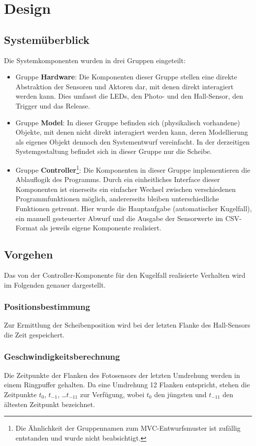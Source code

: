 \chapter{Design}\label{k_design}
\section{Systemüberblick}\label{design_systemueberlick}
Die Systemkomponenten wurden in drei Gruppen eingeteilt:
\begin{itemize}
	\item Gruppe \textbf{Hardware}: Die Komponenten dieser Gruppe stellen eine direkte Abstraktion der Sensoren und Aktoren dar, mit denen direkt interagiert werden kann.
	Dies umfasst die LEDs, den Photo- und den Hall-Sensor, den Trigger und das Release.
	\item Gruppe \textbf{Model}: In dieser Gruppe befinden sich (physikalisch vorhandene) Objekte, mit denen nicht direkt interagiert werden kann, deren Modellierung als eigenes Objekt dennoch den Systementwurf vereinfacht.
	In der derzeitigen Systemgestaltung befindet sich in dieser Gruppe nur die Scheibe.
	\item Gruppe \textbf{Controller}\footnote{Die Ähnlichkeit der Gruppennamen zum MVC-Entwurfsmuster ist zufällig entstanden und wurde nicht beabsichtigt.}:
	Die Komponenten in dieser Gruppe implementieren die Ablauflogik des Programms.
	Durch ein einheitliches Interface dieser Komponenten ist einerseits ein einfacher Wechsel zwischen verschiedenen Programmfunktionen möglich, andererseits bleiben unterschiedliche Funktionen getrennt.
	Hier wurde die Hauptaufgabe (automatischer Kugelfall), ein manuell gesteuerter Abwurf und die Ausgabe der Sensorwerte im CSV-Format als jeweils eigene Komponente realisiert.
\end{itemize}

\section{Vorgehen}
Das von der Controller-Komponente für den Kugelfall realisierte Verhalten wird im Folgenden genauer dargestellt.

\subsection{Positionsbestimmung}\label{design_pos}
Zur Ermittlung der Scheibenposition wird bei der letzten Flanke des Hall-Sensors die Zeit gespeichert.

\subsection{Geschwindigkeitsberechnung}\label{design_geschwindigkeit}
Die Zeitpunkte der Flanken des Fotosensors der letzten Umdrehung werden in einem Ringpuffer gehalten.
Da eine Umdrehung 12 Flanken entspricht, stehen die Zeitpunkte $t_0$, $t_{-1}$, \dots $t_{-11}$ zur Verfügung, wobei $t_0$ den jüngsten und $t_{-11}$ den ältesten Zeitpunkt bezeichnet.

